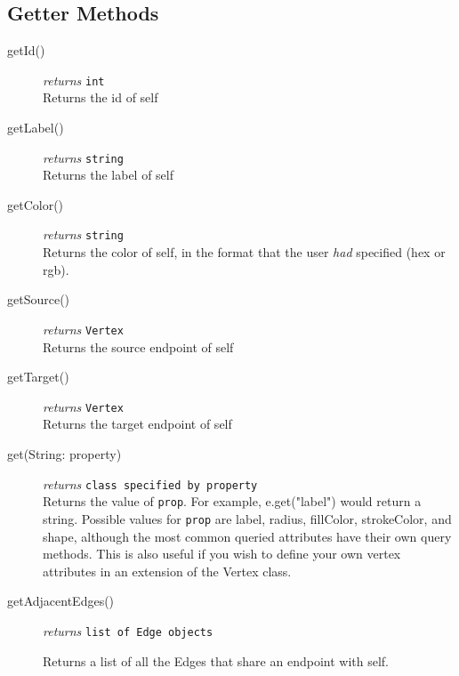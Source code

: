 \documentclass{article}
\newcounter{example}
\newlength\q
\begin{document}
\subsection{Getter Methods}
\begin{description}
\item[getId()] \emph{returns} \texttt{int}\\
Returns the id of self

\item[getLabel()] \emph{returns} \texttt{string}\\
Returns the label of self

\item[getColor()] \emph{returns} \texttt{string}\\
Returns the color of self, in the format that the user \textit{had} specified (hex or rgb).

\item[getSource()] \emph{returns} \texttt{Vertex}\\
Returns the source endpoint of self

\item[getTarget()] \emph{returns} \texttt{Vertex}\\
Returns the target endpoint of self

\item[get(String: property)] \emph{returns} \texttt{class specified by property}\\
Returns the value of \texttt{prop}. For example, e.get("label") would return a string. Possible values for \texttt{prop} are label, radius, fillColor, strokeColor, and shape, although the most common queried attributes have their own query methods. This is also useful if you wish to define your own vertex attributes in an extension of the Vertex class.

\item[getAdjacentEdges()]\emph{returns}
  \texttt{list of Edge objects}

Returns a list of all the Edges that share an endpoint with self.

\end{description}
\end{document}
